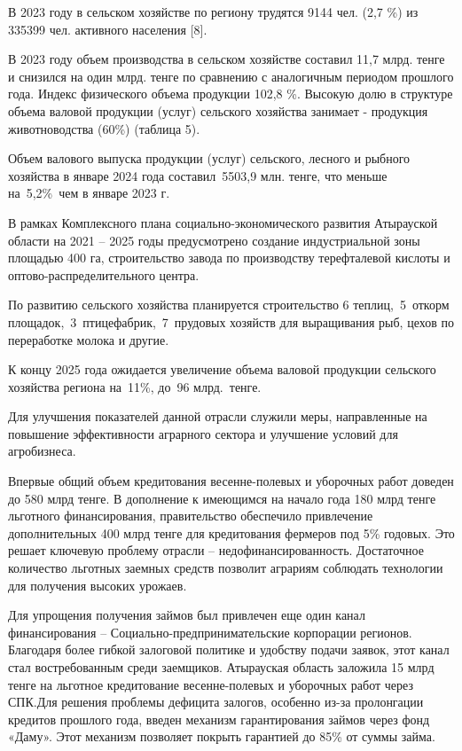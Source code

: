 \begin{multicols}{2}
В 2023 году в сельском хозяйстве по региону трудятся 9144 чел. (2,7 \%)
из 335399 чел. активного населения {[}8{]}.

В 2023 году объем производства в сельском хозяйстве составил 11,7 млрд.
тенге и снизился на один млрд. тенге по сравнению с аналогичным периодом
прошлого года. Индекс физического объема продукции 102,8 \%. Высокую
долю в структуре объема валовой продукции (услуг) сельского хозяйства
занимает - продукция животноводства (60\%) (таблица 5).

Объем валового выпуска продукции (услуг) сельского, лесного и рыбного
хозяйства в январе 2024 года составил~5503,9 млн. тенге, что меньше
на~5,2\%~чем в январе 2023 г.

В рамках Комплексного плана социально-экономического развития Атырауской
области на 2021 -- 2025 годы предусмотрено создание индустриальной зоны
площадью 400 га, строительство завода по производству терефталевой
кислоты и оптово-распределительного центра.

По развитию сельского хозяйства планируется строительство 6
теплиц,~5~откорм площадок,~3~птицефабрик,~7~прудовых хозяйств для
выращивания рыб, цехов по переработке молока и другие.

К концу 2025 года ожидается увеличение объема валовой продукции
сельского хозяйства региона на~11\%, до~96 млрд.~тенге.

Для улучшения показателей данной отрасли служили меры, направленные на
повышение эффективности аграрного сектора и улучшение условий для
агробизнеса.

Впервые общий объем кредитования весенне-полевых и уборочных работ
доведен до 580 млрд тенге. В дополнение к имеющимся на начало года 180
млрд тенге льготного финансирования, правительство обеспечило
привлечение дополнительных 400 млрд тенге для кредитования фермеров под
5\% годовых. Это решает ключевую проблему отрасли --
недофинансированность. Достаточное количество льготных заемных средств
позволит аграриям соблюдать технологии для получения высоких урожаев.

Для упрощения получения займов был привлечен еще один канал
финансирования -- Социально-предпринимательские корпорации регионов.
Благодаря более гибкой залоговой политике и удобству подачи заявок, этот
канал стал востребованным среди заемщиков. Атырауская область заложила
15 млрд тенге на льготное кредитование весенне-полевых и уборочных работ
через СПК.Для решения проблемы дефицита залогов, особенно из-за
пролонгации кредитов прошлого года, введен механизм гарантирования
займов через фонд «Даму». Этот механизм позволяет покрыть гарантией до
85\% от суммы займа.


\end{multicols}
